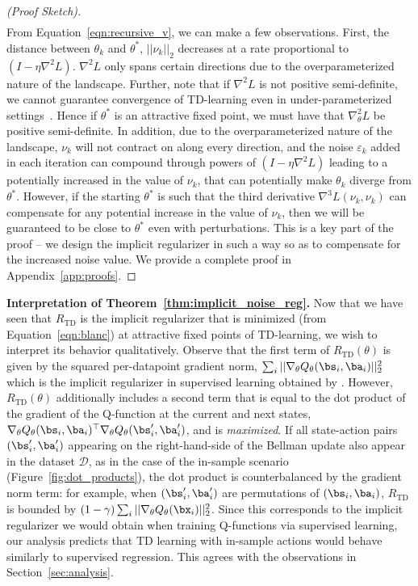 \begin{proof}[(Proof Sketch)]
\begin{align}
\end{align}
From Equation~\ref{eqn:recursive_v}, we can make a few observations. First, the distance between $\theta_k$ and $\theta^*$, $||\nu_k||_2$ decreases at a rate proportional to $(I - \eta \nabla^2 L)$. $\nabla^2 L$ only spans certain directions due to the overparameterized nature of the landscape. Further, note that if  $\nabla^2 L$ is not positive semi-definite, we cannot guarantee convergence of TD-learning even in under-parameterized settings~\citep{ghosh2020representations}. Hence if $\theta^*$ is an attractive fixed point, we must have that $\nabla_\theta^2 L$ be positive semi-definite. In addition, due to the overparameterized nature of the landscape, $\nu_k$ will not contract on along every direction, and the noise $\varepsilon_k$ added in each iteration can compound through powers of $(I - \eta \nabla^2 L)$ leading to a potentially increased in the value of $\nu_{k}$, that can potentially make $\theta_k$ diverge from $\theta^*$. However, if the starting $\theta^*$ is such that the third derivative $\nabla^3 L (\nu_k, \nu_k)$ can compensate for any potential increase in the value of $\nu_k$, then we will be guaranteed to be close to $\theta^*$ even with perturbations. This is a key part of the proof -- we design the implicit regularizer in such a way so as to compensate for the increased noise value. We provide a complete proof in Appendix~\ref{app:proofs}.
\end{proof}

\textbf{Interpretation of Theorem~\ref{thm:implicit_noise_reg}.} Now that we have seen that $R_\mathrm{TD}$ is the implicit regularizer that is minimized (from Equation~\ref{eqn:blanc}) at attractive fixed points of TD-learning, we wish to interpret its behavior qualitatively. Observe that the first term of $R_\mathrm{TD}(\theta)$ is given by the squared per-datapoint gradient norm, $\sum_i ||\nabla_\theta Q_\theta(\bs_i, \ba_i)||_2^2$ which is the implicit regularizer in supervised learning obtained by \citet{blanc2020implicit}. However, $R_\mathrm{TD}(\theta)$ additionally includes a second term that is equal to the dot product of the gradient of the Q-function at the current and next states, $\nabla_\theta Q_\theta(\bs_i, \ba_i)^\top \nabla_\theta Q_\theta(\bs'_i, \ba'_i)$, and is \emph{maximized}. If all state-action pairs $(\bs'_i, \ba'_i)$ appearing on the right-hand-side of the Bellman update also appear in the dataset $\mathcal{D}$, as in the case of the in-sample scenario (Figure~\ref{fig:dot_products}), the dot product is counterbalanced by the gradient norm term: for example, when $(\bs'_i, \ba'_i)$ are permutations of $(\bs_i, \ba_i)$, $R_\mathrm{TD}$ is bounded by $(1 - \gamma) \sum_i ||\nabla_\theta Q_\theta(\bx_i)||_2^2$. Since this corresponds to the implicit regularizer we would obtain when training Q-functions via supervised learning, our analysis predicts that TD learning with in-sample actions would behave similarly to supervised regression. This agrees with the observations in Section~\ref{sec:analysis}.

